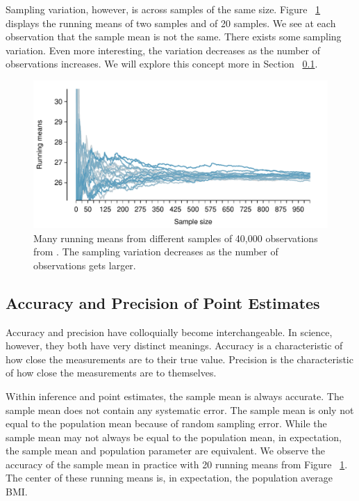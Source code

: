 Sampling variation, however, is across samples of the same size. Figure ~\ref{runningSamplingVariation} displays the running means of two samples and of 20 samples. We see at each observation that the sample mean is not the same. There exists some sampling variation. Even more interesting, the variation decreases as the number of observations increases. We will explore this concept more in Section ~\ref{accuracyAndPrecision}. 

\begin{figure}
   \centering
   \includegraphics[width=\textwidth]{ch_inference_foundations_oi_biostat/figures/brfssBMISampVar/brfssBMISampVar20}
   \caption{Many running means from different samples of 40,000 observations from . The sampling variation decreases as the number of observations gets larger.}
	\label{runningSamplingVariation}
\end{figure}



\subsection{Accuracy and Precision of Point Estimates}
\label{accuracyAndPrecision}

Accuracy and precision have colloquially become interchangeable. In science, however, they both have very distinct meanings. Accuracy is a characteristic of how close the measurements are to their true value. Precision is the characteristic of how close the measurements are to themselves. 

Within inference and point estimates, the sample mean is always accurate. The sample mean does not contain any systematic error. The sample mean is only not equal to the population mean because of random sampling error. While the sample mean may not always be equal to the population mean, in expectation, the sample mean and population parameter are equivalent. We observe the accuracy of the sample mean in practice with 20 running means from Figure ~\ref{runningSamplingVariation}. The center of these running means is, in expectation, the population average BMI. 

